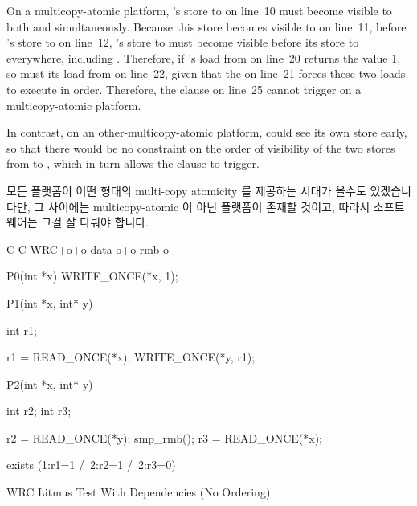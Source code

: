 {	On a multicopy-atomic platform, 's store to  on
	line~10 must become visible to both  and 
	simultaneously.
	Because this store becomes visible to  on line~11, before
	's store to  on line~12, 's store to
	 must become visible before its store to  everywhere,
	including .
	Therefore, if 's load from  on line~20 returns the
	value 1, so must its load from  on line~22, given that
	the  on line~21 forces these two loads to execute
	in order.
	Therefore, the  clause on line~25 cannot trigger on a
	multicopy-atomic platform.

	In contrast, on an other-multicopy-atomic platform, 
	could see its own store early, so that there would be no constraint
	on the order of visibility of the two stores from to ,
	which in turn allows the  clause to trigger.
	\fi
} \QuickQuizEnd

모든 플랫폼이 어떤 형태의 multi-copy atomicity 를 제공하는 시대가 올수도
있겠습니다만, 그 사이에는 multicopy-atomic 이 아닌 플랫폼이 존재할 것이고,
따라서 소프트웨어는 그걸 잘 다뤄야 합니다.

\begin{listing}[tbp]
{ \scriptsize
\begin{verbbox}[\LstLineNo]
C C-WRC+o+o-data-o+o-rmb-o

{
}

P0(int *x)
{
  WRITE_ONCE(*x, 1);
}

P1(int *x, int* y)
{
  int r1;

  r1 = READ_ONCE(*x);
  WRITE_ONCE(*y, r1);
}

P2(int *x, int* y)
{
  int r2;
  int r3;

  r2 = READ_ONCE(*y);
  smp_rmb();
  r3 = READ_ONCE(*x);
}

exists (1:r1=1 /\ 2:r2=1 /\ 2:r3=0)
\end{verbbox}
}
\centering
\theverbbox
\caption{WRC Litmus Test With Dependencies (No Ordering)}
\label{lst:memorder:WRC Litmus Test With Dependencies (No Ordering)}
\end{listing}

